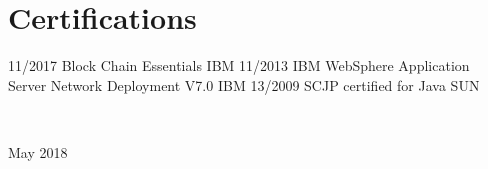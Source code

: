 \documentclass[]{friggeri-cv}
\begin{document}
\section{Certifications}
\begin{entrylist}
  \entry
    {11/2017}
    {Block Chain Essentials}
    {IBM}
    {}
    \entry
    {11/2013}
    {IBM WebSphere Application Server Network Deployment V7.0}
    {IBM}
    {}
    \entry
    {13/2009}
    {SCJP certified for Java}
    {SUN}
    {}
\end{entrylist}


    ~
    ~
    ~




\begin{flushright}
\footnotesize{May 2018}
\end{flushright}
\end{document}
